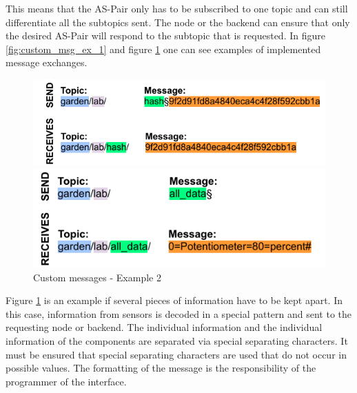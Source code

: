 This means that the AS-Pair only has to be subscribed to one topic and can still differentiate all the subtopics sent. The node or the backend can ensure that only the desired AS-Pair will respond to the subtopic that is requested. In figure \ref{fig:custom_msg_ex_1} and figure \ref{fig:custom_msg_ex_2} one can see examples of implemented message exchanges.

\begin{figure}[H]
     \centering
     \captionsetup{justification=centering}
     \begin{minipage}[b]{0.5\textwidth}
         \centering
         \includegraphics[width=\textwidth]{images/4_2/custom_example_1.pdf}
         \caption{Custom messages - Example 1}
         \label{fig:custom_msg_ex_1}
     \end{minipage}%
     \begin{minipage}[b]{0.5\textwidth}
         \centering
         \includegraphics[width=\textwidth]{images/4_2/custom_example_2.pdf}
         \caption{Custom messages - Example 2}
         \label{fig:custom_msg_ex_2}
     \end{minipage}
\end{figure}


Figure \ref{fig:custom_msg_ex_2} is an example if several pieces of information have to be kept apart. In this case, information from sensors is decoded in a special pattern and sent to the requesting node or backend. The individual information and the individual information of the components are separated via special separating characters. It must be ensured that special separating characters are used that do not occur in possible values. The formatting of the message is the responsibility of the programmer of the interface.\\

